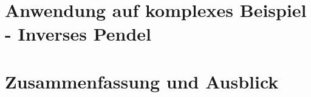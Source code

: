 \documentclass[arbeit=studie,oneside,BCOR=12mm]{ArbeitRST}
\begin{document}
\chapter{Anwendung auf komplexes Beispiel - Inverses Pendel}

\chapter{Zusammenfassung und Ausblick}








%
%
%
%
%
%
%
%
%
%
%
\end{document}
